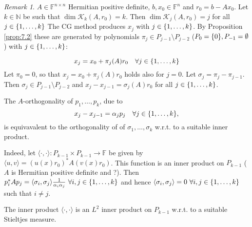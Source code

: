 \documentclass[12pt]{article}
\newcounter{lecture}
\theoremstyle{definition}
\theoremstyle{remark}
\newtheorem{remark}[theorem]{Remark}
\numberwithin{equation}{section}
\newcommand{\F}{\mathbb{F}}
\newcommand{\N}{\mathbb{N}}
\newcommand{\K}{\mathcal{K}}
\DeclarePairedDelimiter{\set}{\{}{\}}
\begin{document}
\begin{remark}
  \label{rem:8.1}
  $A \in \F^{n\times n}$ Hermitian positive definite, $b,x_0 \in \F^n$ and $r_0 = b - Ax_0$. Let $k \in \N$ be such that $\dim \K_k(A,r_0) = k$. Then $\dim \K_j(A,r_0) = j$ for all $j \in \set{1,\ldots,k}$ The CG method produces $x_j$ with $j \in \set{1,\ldots,k}$. By Proposition \ref{prop:7.2} these are generated by polynomials $\pi_j \in P_{j-1} \setminus P_{j-2}$ ($P_0 = \set{0}, P_{-1}=\emptyset$) with $j \in \set{1,\ldots,k}$:

  \begin{equation*}
    x_j = x_0 + \pi_j(A) r_0 \quad \forall j \in \set{1,\ldots,k}
  \end{equation*}
  Let $\pi_0 = 0$, so that $x_j = x_0 + \pi_j(A) r_0$ holds also for $j=0$. Let $\sigma_j = \pi_j - \pi_{j-1}$. Then $\sigma_j \in P_{j-1} \setminus P_{j-2}$ and $x_j - x_{j-1} = \sigma_j(A) r_0$ for all $j \in \set{1,\ldots,k}$.
\end{remark}

The $A$-orthogonality of $p_1, \ldots, p_k$, due to
\begin{equation*}
  x_j - x_{j-1} = \alpha_j p_j\quad \forall j \in \set{1,\ldots,k},
\end{equation*}
is equivavalent to the orthogonality of of $\sigma_1, \ldots, \sigma_k$ w.r.t. to a suitable inner product.

Indeed, let $\langle\cdot,\cdot\rangle: P_{k-1} \times P_{k-1} \rightarrow \F$ be given by $\langle u,v\rangle = (u(x)r_0)^* A (v(x)r_0)$.  This function is an inner product on $P_{k-1}$ ($A$ is Hermitian positive definite and ?). Then $p_i^* A p_j = \langle \sigma_i, \sigma_j \rangle \frac{1}{\alpha_i \alpha_j}\ \forall i,j \in \set{1,\ldots,k}$ and hence $\langle \sigma_i, \sigma_j \rangle = 0\ \forall i,j \in \set{1,\ldots,k}$ such that $i \neq j$.

The inner product $\langle \cdot, \cdot \rangle$ is an $L^2$ inner product on $P_{k-1}$ w.r.t. to a suitable Stieltjes measure.
\end{document}
